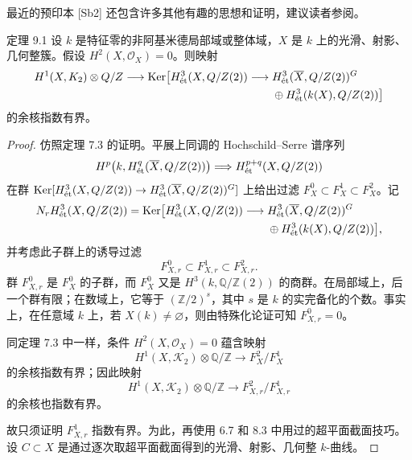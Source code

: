 最近的预印本 [Sb2] 还包含许多其他有趣的思想和证明，建议读者参阅。
\begin{statement}{定理 9.1}
设 $k$ 是特征零的非阿基米德局部域或整体域，$X$ 是 $k$ 上的光滑、射影、几何整簇。假设 $H^2(X,\mathcal O_X)=0$。则映射
\[
\begin{split}
 H^1(X,K_2)\otimes Q/Z
 \longrightarrow\operatorname{Ker}\bigl[H^3_{\mathrm{\acute et}}(X,Q/Z(2))
 \longrightarrow {}&H^3_{\mathrm{\acute et}}(\overline X,Q/Z(2))^G\\
 &\oplus H^3_{\mathrm{\acute et}}(k(X),Q/Z(2))\bigr]
\end{split}
\]
的余核指数有界。
\end{statement}
\begin{proof}
仿照定理 7.3 的证明。平展上同调的 Hochschild--Serre 谱序列
\[
 H^p\bigl(k,H^q_{\mathrm{\acute et}}(\overline X,Q/Z(2))\bigr)
 \Longrightarrow H^{p+q}_{\mathrm{\acute et}}(X,Q/Z(2))
\]
在群 $\operatorname{Ker}[H^3_{\mathrm{\acute et}}(X,Q/Z(2))\to H^3_{\mathrm{\acute et}}(\overline X,Q/Z(2))^G]$ 上给出过滤 $F_X^0\subset F_X^1\subset F_X^2$。记
\[
\begin{split}
 N_rH^3_{\mathrm{\acute et}}(X,Q/Z(2))
 =\operatorname{Ker}\bigl[H^3_{\mathrm{\acute et}}(X,Q/Z(2))
 \longrightarrow {}&H^3_{\mathrm{\acute et}}(\overline X,Q/Z(2))^G\\
 &\oplus H^3_{\mathrm{\acute et}}(k(X),Q/Z(2))\bigr],
\end{split}
\]
并考虑此子群上的诱导过滤
\[
 F_{X,r}^0\subset F_{X,r}^1\subset F_{X,r}^2.
\]
群 $F_{X,r}^0$ 是 $F_X^0$ 的子群，而 $F_X^0$ 又是 $H^3(k,\mathbb Q/\mathbb Z(2))$ 的商群。在局部域上，后一个群有限；在数域上，它等于 $(\mathbb Z/2)^s$，其中 $s$ 是 $k$ 的实完备化的个数。事实上，在任意域 $k$ 上，若 $X(k)\ne\varnothing$，则由特殊化论证可知 $F_{X,r}^0=0$。

同定理 7.3 中一样，条件 $H^2(X,\mathcal O_X)=0$ 蕴含映射
\[
 H^1(X,\mathcal K_2)\otimes\mathbb Q/\mathbb Z\longrightarrow F_X^2/F_X^1
\]
的余核指数有界；因此映射
\[
 H^1(X,\mathcal K_2)\otimes\mathbb Q/\mathbb Z
 \longrightarrow F_{X,r}^2/F_{X,r}^1
\]
的余核也指数有界。

故只须证明 $F_{X,r}^1$ 指数有界。为此，再使用 6.7 和 8.3 中用过的超平面截面技巧。设 $C\subset X$ 是通过逐次取超平面截面得到的光滑、射影、几何整 $k$-曲线。


\end{proof}
